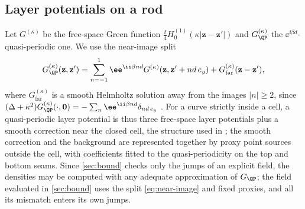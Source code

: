 \subsection{Layer potentials on a rod}\label{sec:layer}
Let $G^{(\kappa)}$ be the free-space Green function $\frac{\ii}{4}H^{(1)}_0(\kappa|
\mathbf z-\mathbf z'|)$ and $G^{(\kappa)}_\QP$ the $\ee^{\ii\beta d}$-quasi-periodic
one. We use the near-image split
\begin{equation}\label{eq:near-image}
  G^{(\kappa)}_\QP(\mathbf z,\mathbf z')=\sum_{n=-1}^{1}\ee^{\ii\beta nd}G^{(\kappa)}(\mathbf z,
  \mathbf z'+nd\,e_y)+G^{(\kappa)}_{\mathrm{far}}(\mathbf z-\mathbf z'),
\end{equation}
where $G^{(\kappa)}_{\mathrm{far}}$ is a smooth Helmholtz solution away from the
images $|n|\ge2$, since $(\Delta+\kappa^2)G^{(\kappa)}_\QP(\cdot,\mathbf 0)=
-\sum_n\ee^{\ii\beta nd}\delta_{nd\,e_y}$ \cite{Linton1998}. For a curve strictly inside a cell,
a quasi-periodic layer potential is thus three free-space layer potentials plus
a smooth correction near the closed cell, the structure used in
\cite{BarnettGreengard2010,BarnettGreengard2011,ChoBarnett2015}; the smooth
correction and the background are represented together by proxy point sources
outside the cell, with coefficients fitted to the quasi-periodicity on the top
and bottom seams. Since \cref{sec:bound} checks only the jumps of an explicit
field, the densities may be computed with any adequate approximation of
$G_\QP$; the field evaluated in \cref{sec:bound} uses the split
\eqref{eq:near-image} and fixed proxies, and all its mismatch enters its own
jumps.

